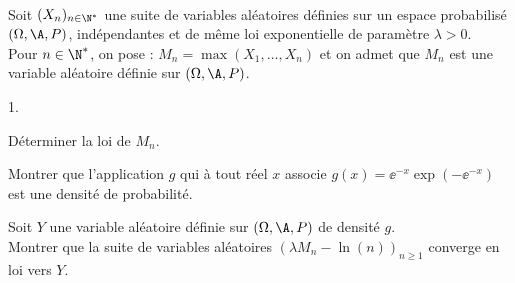 \documentclass[11pt]{article}%
\begin{document}

\begin{exerciceSP}~\\
  Soit $(X_n)_{n\in\N^*}$ une suite de variables aléatoires définies
  sur un espace probabilisé $(\Omega,\A,P)$, indépendantes et de même
  loi exponentielle de paramètre $\lambda>0$.\\
  Pour $n\in\N^*$, on pose : $M_n=\max(X_1,\hdots,X_n)$ et on admet
  que $M_n$ est une variable aléatoire définie sur $(\Omega,\A,P)$.
  \begin{noliste}{1.}
    \setlength{\itemsep}{2mm}
  \item Déterminer la loi de $M_n$.
  \item Montrer que l'application $g$ qui à tout réel $x$ associe
    $g(x)=\ee^{-x}\exp\left(-\ee^{-x}\right)$ est une densité de
    probabilité.
  \item Soit $Y$ une variable aléatoire définie sur $(\Omega,\A,P)$ de
    densité $g$.\\
    Montrer que la suite de variables aléatoires $(\lambda M_n -
    \ln(n))_{n\geq 1}$ converge en loi vers $Y$.
  \end{noliste}
\end{exerciceSP}


\newpage


\end{document}
